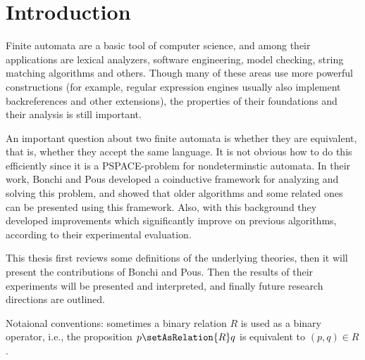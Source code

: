 \section{Introduction}

Finite automata are a basic tool of computer science, and among their
applications are lexical analyzers, software engineering, model checking,
string matching algorithms and others. Though many of these areas use more powerful
constructions (for example, regular expression engines usually also implement
backreferences and other extensions), the properties of their foundations and
their analysis is still important.

An important question about two finite automata is whether they are equivalent,
that is, whether they accept the same language. It is not obvious how to do
this efficiently since it is a PSPACE-problem for nondeterminstic automata.
In their work, Bonchi and Pous developed a coinductive framework for analyzing
and solving this problem, and showed that older algorithms and some related ones can
be presented using this framework. Also, with this background they developed
improvements which significantly improve on previous
algorithms\cite{doyen2010antichain}\cite{abdulla2010simulation}, according to
their experimental evaluation.

This thesis first reviews some definitions of the underlying theories, then
it will present the contributions of Bonchi and Pous. Then the results
of their experiments will be presented and interpreted, and finally future research
directions are outlined.

Notaional conventions: sometimes a binary relation $R$ is used as a binary
operator, i.e., the proposition $p \setAsRelation{R} q$ is equivalent to $(p, q) \in R$.
